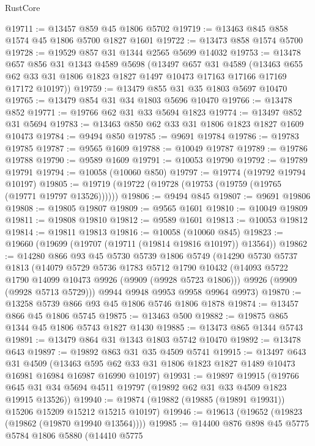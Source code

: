 \begin{lexlean}{RustCore}
\begin{coremodule}
@19711 := @13457 @859 @45 @1806 @5702
@19719 := @13463 @845 @858 @1574 @45 @1806 @5700 @1827 @1601
@19722 := @13473 @858 @1574 @5700
@19728 := @19529 @857 @31 @1344 @2565 @5699 @14032
@19753 := @13478
    @657
    @856
    @31
    @1343
    @4589
    @5698
    (@13497
      @657
      @31
      @4589
      (@13463 @655 @62 @33 @31 @1806 @1823 @1827 @1497 @10473 @17163 @17166 @17169 @17172 @10197))
@19759 := @13479 @855 @31 @35 @1803 @5697 @10470
@19765 := @13479 @854 @31 @34 @1803 @5696 @10470
@19766 := @13478 @852
@19771 := @19766 @62 @31 @33 @5694 @1823
@19774 := @13497 @852 @31 @5694
@19783 := @13463 @850 @62 @33 @31 @1806 @1823 @1827 @1609 @10473
@19784 := @9494 @850
@19785 := @9691 @19784
@19786 := @19783 @19785
@19787 := @9565 @1609
@19788 := @10049 @19787
@19789 := @19786 @19788
@19790 := @9589 @1609
@19791 := @10053 @19790
@19792 := @19789 @19791
@19794 := @10058 (@10060 @850)
@19797 := @19774 (@19792 @19794 @10197)
@19805 := @19719 (@19722 (@19728 (@19753 (@19759 (@19765 (@19771 @19797 @13526))))))
@19806 := @9494 @845
@19807 := @9691 @19806
@19808 := @19805 @19807
@19809 := @9565 @1601
@19810 := @10049 @19809
@19811 := @19808 @19810
@19812 := @9589 @1601
@19813 := @10053 @19812
@19814 := @19811 @19813
@19816 := @10058 (@10060 @845)
@19823 := @19660 (@19699 (@19707 (@19711 (@19814 @19816 @10197)) @13564))
@19862 := @14280
    @866
    @93
    @45
    @5730
    @5739
    @1806
    @5749
    (@14290
      @5730
      @5737
      @1813
      (@14079
        @5729
        @5736
        @1783
        @5712
        @1790
        @10432
        (@14093 @5722 @1790 @14099 @10473 @9926 (@9909 (@9928 @5723 @1806)))
        @9926
        (@9909 (@9928 @5713 @5729)))
      @9944
      @9948
      @9953
      @9958
      @9964
      @9973)
@19870 := @13258 @5739 @866 @93 @45 @1806 @5746 @1806 @1878
@19874 := @13457 @866 @45 @1806 @5745
@19875 := @13463 @500
@19882 := @19875 @865 @1344 @45 @1806 @5743 @1827 @1430
@19885 := @13473 @865 @1344 @5743
@19891 := @13479 @864 @31 @1343 @1803 @5742 @10470
@19892 := @13478 @643
@19897 := @19892 @863 @31 @35 @4509 @5741
@19915 := @13497
    @643
    @31
    @4509
    (@13463 @595 @62 @33 @31 @1806 @1823 @1827 @1489 @10473 @16981 @16984 @16987 @16990 @10197)
@19931 := @19897
    @19915
    (@19766 @645 @31 @34 @5694 @4511 @19797 (@19892 @62 @31 @33 @4509 @1823 @19915 @13526))
@19940 := @19874 (@19882 (@19885 (@19891 @19931)) @15206 @15209 @15212 @15215 @10197)
@19946 := @19613 (@19652 (@19823 (@19862 (@19870 @19940 @13564))))
@19985 := @14400
    @876
    @898
    @45
    @5775
    @5784
    @1806
    @5880
    (@14410
      @5775

\end{coremodule}
\end{lexlean}
